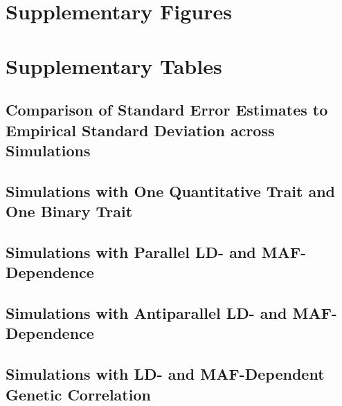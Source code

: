 \documentclass[11pt]{article}
\begin{document}





\newpage
\section{Supplementary Figures}
\newpage
\section{Supplementary Tables}

\subsection{Comparison of Standard Error Estimates to Empirical Standard Deviation across Simulations}



\newpage
\subsection{Simulations with One Quantitative Trait and One Binary Trait}



\newpage
\subsection{Simulations with Parallel LD- and MAF-Dependence}
\label{parallel}



\newpage
\subsection{Simulations with Antiparallel LD- and MAF-Dependence}



\newpage
\subsection{Simulations with LD- and MAF-Dependent Genetic Correlation}
\label{antiparallel}



\newpage


\end{document}
